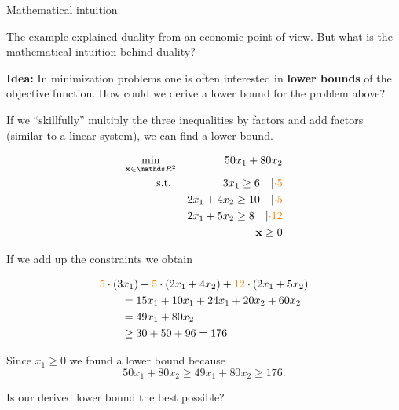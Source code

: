 \documentclass[11pt,compress,t,notes=noshow, xcolor=table]{beamer}
\begin{document}
\normalsize
\begin{vbframe}{Mathematical intuition}

The example explained duality from an economic point of view. But what is the mathematical intuition behind duality?

\lz

\textbf{Idea: } In minimization problems one is often interested in \textbf{lower bounds} of the objective function. How could we derive a lower bound for the problem above?

\lz

If we \enquote{skillfully} multiply the three inequalities by factors and add factors (similar to a linear system), we can find a lower bound.

\framebreak
\vspace*{-1.4cm}

\begin{eqnarray*}
\min_{\xv\in \R^2} && 50x_1 + 80x_2  \\
\text{s.t. } && 3x_1 \ge 6 \quad \vert\textcolor{orange}{\cdot 5}\\
&& 2x_1 + 4x_2 \ge 10 \quad \vert \textcolor{orange}{\cdot 5} \\
&& 2x_1 + 5x_2 \ge 8 \quad \vert \textcolor{orange}{\cdot 12} \\
&& \xv \ge 0
\end{eqnarray*}

\vspace*{-0.2cm}

If we add up the constraints we obtain

\vspace*{-0.5cm}
\begin{align*}
    & \textcolor{orange}{5} \cdot (3x_1) + \textcolor{orange}{5} \cdot (2x_1 + 4x_2) + \textcolor{orange}{12} \cdot (2x_1 + 5x_2) \\
    &\qquad = 15x_1 + 10x_1 + 24x_1 + 20x_2 + 60x_2 \\
    &\qquad = 49 x_1 + 80 x_2 \\
    &\qquad \ge 30 + 50 + 96 = 176
\end{align*}

Since $x_1 \ge 0$ we found a lower bound because
\begin{equation*}
    50x_1 + 80 x_2 \ge 49 x_1 + 80 x_2 \ge 176.
\end{equation*}

\framebreak

Is our derived lower bound the best possible?


\end{vbframe}
\end{document}
